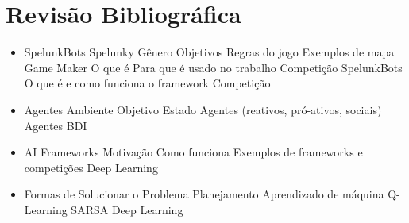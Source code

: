\chapter{\label{chap:lit-review}Revisão Bibliográfica}

\begin{itemize}
    \item SpelunkBots
        \subitem Spelunky
            \subsubitem Gênero
            \subsubitem Objetivos
            \subsubitem Regras do jogo
            \subsubitem Exemplos de mapa
        \subitem Game Maker
            \subsubitem O que é
            \subsubitem Para que é usado no trabalho   
        \subitem Competição SpelunkBots
            \subsubitem O que é e como funciona o framework
            \subsubitem Competição
    \item Agentes
        \subitem Ambiente
        \subitem Objetivo
        \subitem Estado
        \subitem Agentes (reativos, pró-ativos, sociais)
        \subitem Agentes BDI
    \item AI Frameworks
        \subitem Motivação
        \subitem Como funciona
        \subitem Exemplos de frameworks e competições
        \subitem Deep Learning
    \item Formas de Solucionar o Problema
        \subitem Planejamento
        \subitem Aprendizado de máquina
            \subsubitem Q-Learning
            \subsubitem SARSA
            \subsubitem Deep Learning
\end{itemize}
